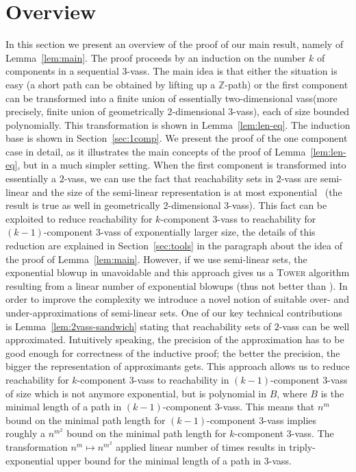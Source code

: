 \documentclass[a4paper, UKenglish, cleveref, autoref, thm-restate]{lipics-v2021}
\newcommand{\Z}{\mathbb{Z}}
\newcommand{\tower}{\textsc{Tower}\xspace}
\newcommand{\vass}{{\sc vass}\xspace}
\newcommand{\dvass}{\parvass 2}
\newcommand{\tvass}{\parvass 3}
\newcommand{\geomvass}{geometrically 2-dimensional \tvass}
\newcommand{\parvass}[1]{{$#1$-\vass}\xspace}
\begin{document}
\section{Overview} \label{sec:overview}
In this section we present an overview of the proof of our main result, namely of Lemma~\ref{lem:main}.
The proof proceeds by an induction on the number $k$ of components in a sequential \tvass.
The main idea is that either the situation is easy (a short path can be obtained by lifting up a $\Z$-path)
or the first component can be transformed into a finite union of essentially two-dimensional \vass (more precisely,
finite union of \geomvass), each of size bounded polynomially. This transformation is shown in Lemma~\ref{lem:len-eq}.
The induction base is shown in Section~\ref{sec:1comp}. We present the proof of the one component case in detail,
as it illustrates the main concepts of the proof of Lemma~\ref{lem:len-eq}, but in a much simpler setting.
When the first component is transformed into essentially a \dvass, we can use the fact that
reachability sets in \dvass are semi-linear and the size of the semi-linear representation
is at most exponential~\cite{BlondinFGHM15} (the result is true as well in \geomvass).
This fact can be exploited to reduce reachability for $k$-component \tvass to reachability for $(k-1)$-component \tvass
of exponentially larger size, the details of this reduction are explained in Section~\ref{sec:tools}
in the paragraph about the idea of the proof of Lemma~\ref{lem:main}.
However, if we use semi-linear sets, the exponential blowup in unavoidable and this approach gives us a \tower algorithm
resulting from a linear number of exponential blowups (thus not better than \cite{DBLP:conf/icalp/FuYZ24}).
In order to improve the complexity we introduce a novel notion of suitable over- and under-approximations of semi-linear sets.
One of our key technical contributions is Lemma~\ref{lem:2vass-sandwich} stating that reachability sets
of \dvass can be well approximated. 
Intuitively speaking, the precision of the approximation has to be good enough for correctness of the inductive proof;
the better the precision, the bigger the representation of approximants gets.
This approach allows us to reduce reachability for $k$-component \tvass to reachability in $(k-1)$-component \tvass of size which is not anymore exponential, but is polynomial in $B$,
where $B$ is the minimal length of a path in $(k-1)$-component \tvass.
This means that $n^m$ bound on the minimal path length for $(k-1)$-component \tvass implies roughly a $n^{m^2}$
bound on the minimal path length for $k$-component \tvass. The transformation
$n^m \mapsto n^{m^2}$ applied linear number of times results in triply-exponential upper bound for the minimal length of a path in \tvass.
\end{document}
